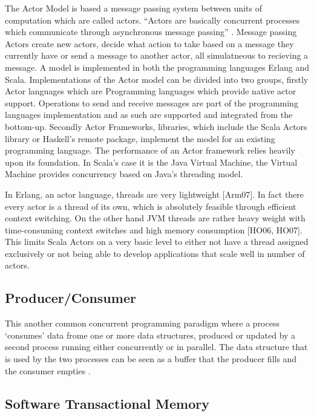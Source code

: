 \documentclass[main.tex]{subfiles}
\begin{document}
{{The Actor Model is based a message passing system between units of computation which are called actors. ``Actors are basically concurrent processes which communicate through asynchronous message passing'' \cite{Odersky2006}. Message passing Actors create new actors, decide what action to take based on a message they currently have or send a message to another actor, all simulatneous to recieving a message. A model is implemented in both the programming languages Erlang and Scala. Implementations of the Actor model can be divided into two groups, firstly Actor languages which are Programming languages which provide native actor support. Operations to send and receive messages are part of the programming languages implementation and as such are supported and integrated from the bottom-up. Secondly Actor Frameworks, libraries, which include the Scala Actors library or Haskell's remote package, implement the model for an existing programming language. The performance of an Actor framework relies heavily upon its foundation. In Scala's case it is the Java Virtual Machine, the Virtual Machine provides concurrency based on Java's threading model.

In Erlang, an actor language, threads are very lightweight [Arm07]. In fact there every actor is a thread of its own, which is absolutely feasible through efficient context switching.
On the other hand JVM threads are rather heavy weight with time-consuming context switches and high memory consumption [HO06, HO07]. This limits Scala Actors on a very basic level to either not have a thread assigned exclusively or not being able to develop applications that scale well in number of actors.

\subsection{Producer/Consumer}

This another common concurrent programming paradigm where a process `consumes' data frome one or more data structures, produced or updated by a second process running either concurrently or in parallel. The data structure that is used by the two processes can be seen as a buffer that the producer fills and the consumer empties \cite{Trinder1998}.

\subsection{Software Transactional Memory}

}}
\end{document}
